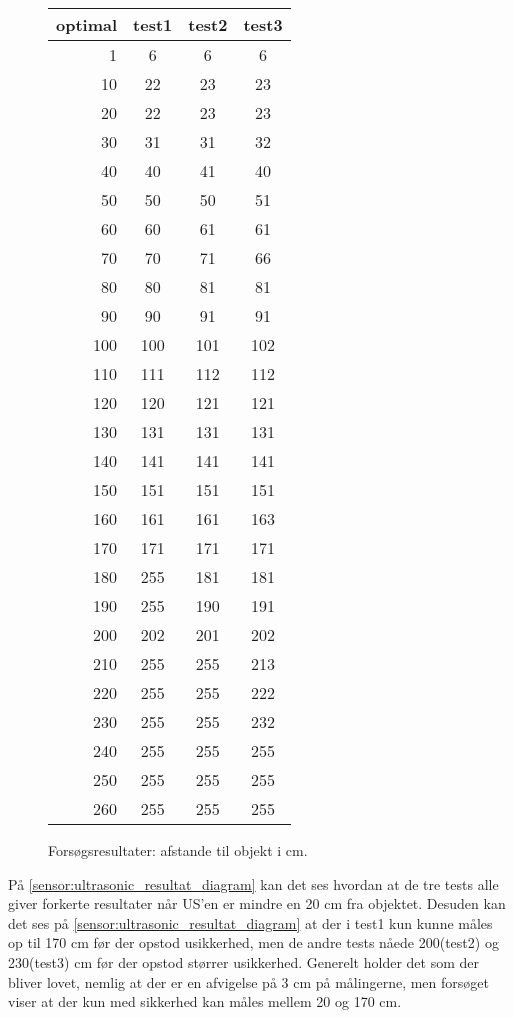 \begin{figure}[h]
\centering
\begin{tabular}{r | c | c | c |}
optimal & test1 & test2 & test3 \\
\hline
1 & 6 & 6 & 6 \\
10&	22&	23&	23\\
20&	22&	23&	23\\
30&	31&	31&	32\\
40&	40&	41&	40\\
50&	50&	50&	51\\
60&	60&	61&	61\\
70&	70&	71&	66\\
80&	80&	81&	81\\
90&	90&	91&	91\\
100&	100&	101&	102\\
110&	111&	112&	112\\
120&	120&	121&	121\\
130&	131&	131&	131\\
140&	141&	141&	141\\
150&	151&	151&	151\\
160&	161&	161&	163\\
170&	171&	171&	171\\
180&	255&	181&	181\\
190&	255&	190&	191\\
200&	202&	201&	202\\
210&	255&	255&	213\\
220&	255&	255&	222\\
230&	255&	255&	232\\
240&	255&	255&	255\\
250&	255&	255&	255\\
260&	255&	255&	255\\
\end{tabular}
\caption{Forsøgsresultater: afstande til objekt i cm.}
\label{sensor:ultrasonic_test_data}
\end{figure}

På \cref{sensor:ultrasonic_resultat_diagram} kan det ses hvordan at de tre tests alle giver forkerte resultater når US'en er mindre en 20 cm fra objektet.
Desuden kan det ses på \cref{sensor:ultrasonic_resultat_diagram} at der i test1 kun kunne måles op til 170 cm før der opstod usikkerhed, men de andre tests nåede 200(test2) og 230(test3) cm før der opstod størrer usikkerhed.
Generelt holder det som der bliver lovet, nemlig at der er en afvigelse på 3 cm på målingerne, men forsøget viser at der kun med sikkerhed kan måles mellem 20 og 170 cm.

